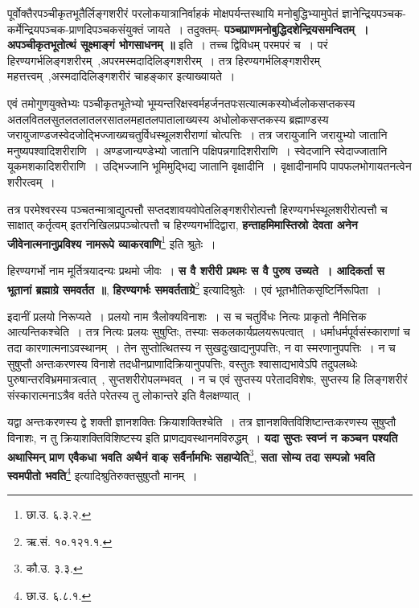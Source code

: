 	पूर्वोक्तैरपञ्चीकृतभूतैर्लिङ्गशरीरं परलोकयात्रानिर्वाहकं मोक्षपर्यन्तस्थायि मनोबुद्धिभ्यामुपेतं ज्ञानेन्द्रियपञ्चक-कर्मेन्द्रियपञ्चक-प्राणदिपञ्चकसंयुक्तं जायते~। तदुक्तम्- {\bfseries पञ्चप्राणमनोबुद्धिदशेन्द्रियसमन्वितम्~। अपञ्चीकृतभूतोत्थं सूक्ष्माङ्गं भोगसाधनम् ॥} इति~। तच्च द्विविधम् परमपरं च~। परं हिरण्यगर्भलिङ्गशरीरम्~,अपरमस्मदादिलिङ्गशरीरम्~। तत्र हिरण्यगर्भलिङ्गशरीरम् महत्तत्त्वम्~,अस्मदादिलिङ्गशरीरं चाहङ्कार इत्याख्यायते~।\par
	एवं तमोगुणयुक्तेभ्यः पञ्चीकृतभूतेभ्यो भूम्यन्तरिक्षस्वर्महर्जनतपःसत्यात्मकस्योर्ध्वलोकसप्तकस्य अतलवितलसुतलतलातलरसातलमहातलपातालाख्यस्य अधोलोकसप्तकस्य ब्रह्माण्डस्य जरायुजाण्डजस्वेदजोद्भिज्जाख्यचतुर्विधस्थूलशरीराणां चोत्पत्तिः~। तत्र जरायुजानि जरायुभ्यो जातानि मनुष्यपश्वादिशरीराणि~। अण्डजान्यण्डेभ्यो जातानि पक्षिपन्नगादिशरीराणि~। स्वेदजानि स्वेदाज्जातानि यूकमशकादिशरीराणि~। उद्भिज्जानि भूमिमुद्भिद्य जातानि वृक्षादीनि~। वृक्षादीनामपि पापफलभोगायतनत्वेन शरीरत्वम्~।\par
	तत्र परमेश्वरस्य पञ्चतन्मात्राद्युत्पत्तौ सप्तदशावयवोपेतलिङ्गशरीरोत्पत्तौ हिरण्यगर्भस्थूलशरीरोत्पत्तौ च साक्षात् कर्तृत्वम् इतरनिखिलप्रपञ्चोत्पत्तौ च हिरण्यगर्भादिद्वारा, {\bfseries हन्ताहमिमास्तिस्रो देवता अनेन जीवेनात्मनानुप्रविश्य नामरूपे व्याकरवाणि}\footnote{छा.उ. ६.३.२.} इति श्रुतेः~।\par
	हिरण्यगर्भो नाम मूर्तित्रयादन्यः प्रथमो जीवः~। {\bfseries स वै शरीरी प्रथमः स वै पुरुष उच्यते~। आदिकर्ता स भूतानां ब्रह्माग्रे समवर्तत ॥}, {\bfseries हिरण्यगर्भः समवर्तताग्रे}\footnote{ऋ.सं. १०.१२१.१.} इत्यादिश्रुतेः~। एवं भूतभौतिकसृष्टिर्निरूपिता~।\par
	इदानीं प्रलयो निरूप्यते~। प्रलयो नाम त्रैलोक्यविनाशः~। स च चतुर्विधः नित्यः प्राकृतो नैमित्तिक आत्यन्तिकश्चेति~। तत्र नित्यः प्रलयः सुषुप्तिः, तस्याः सकलकार्यप्रलयरूपत्वात्~। धर्माधर्मपूर्वसंस्काराणां च तदा कारणात्मनाऽवस्थानम्~। तेन सुप्तोत्थितस्य न सुखदुःखाद्यनुपपत्तिः, न वा स्मरणानुपपत्तिः~। न च सुषुप्तौ अन्तःकरणस्य विनाशे तदधीनप्राणादिक्रियानुपपत्तिः, वस्तुतः श्वासाद्यभावेऽपि तदुपलब्धेः पुरुषान्तरविभ्रममात्रत्वात्~, सुप्तशरीरोपलम्भवत्~। न च एवं सुप्तस्य परेतादविशेषः, सुप्तस्य हि लिङ्गशरीरं संस्कारात्मनाऽत्रैव वर्तते परेतस्य तु लोकान्तरे इति वैलक्षण्यात्~।\par
	यद्वा अन्तःकरणस्य द्वे शक्ती ज्ञानशक्तिः क्रियाशक्तिश्चेति~। तत्र ज्ञानशक्तिविशिष्टान्तःकरणस्य सुषुप्तौ विनाशः, न तु क्रियाशक्तिविशिष्टस्य इति प्राणद्यवस्थानमविरुद्धम्~। {\bfseries यदा सुप्तः स्वप्नं न कञ्चन पश्यति अथास्मिन् प्राण एवैकधा भवति अथैनं वाक् सर्वैर्नामभिः सहाप्येति}\footnote{कौ.उ. ३.३.}, {\bfseries सता सोम्य तदा सम्पन्नो भवति स्वमपीतो भवति}\footnote{छा.उ. ६.८.१.} इत्यादिश्रुतिरुक्तसुषुप्तौ मानम्~।\par
